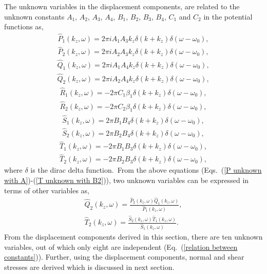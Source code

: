 \documentclass[10pt]{asme2ej}
\begin{document}
The unknown variables in the displacement components, are related to the unknown constants $A_1$, $A_2$, $A_3$, $A_4$, $B_1$, $B_2$, $B_3$, $B_4$, $C_1$ and $C_2$ in the potential functions as,
\begin{align}\label{P unknown with A}
    \hat{P}_1(k_z,\omega) = 2\pi i A_1 A_3 k_z\delta(k+k_z)\delta(\omega-\omega_0),\\\hat{P}_2(k_z,\omega) = 2\pi i A_2 A_3 k_z\delta(k+k_z)\delta(\omega-\omega_0),
\end{align}
\begin{align}\label{Q unknown with A}
    \hat{Q}_1(k_z,\omega) = 2\pi i A_1 A_4 k_z\delta(k+k_z)\delta(\omega-\omega_0),\\\hat{Q}_2(k_z,\omega) = 2\pi i A_2 A_4 k_z\delta(k+k_z)\delta(\omega-\omega_0),
\end{align}
\begin{align}\label{R unknown with C}
    \hat{R}_1(k_z,\omega) = -2\pi C_1\beta_1\delta(k+k_z)\delta(\omega-\omega_0),\\\hat{R}_2(k_z,\omega) = -2\pi C_2\beta_1\delta(k+k_z)\delta(\omega-\omega_0),
\end{align}
\begin{align}\label{S unknown with B}
    \hat{S}_1(k_z,\omega) = 2\pi B_1 B_4\delta(k+k_z)\delta(\omega-\omega_0),\\ \hat{S}_2(k_z,\omega) = 2\pi B_2 B_4\delta(k+k_z)\delta(\omega-\omega_0),
\end{align}
\begin{align}\label{T unknown with B}
    \hat{T}_1(k_z,\omega) = -2\pi B_1 B_3\delta(k+k_z)\delta(\omega-\omega_0),\\ \hat{T}_2(k_z,\omega) = -2\pi B_2 B_3\delta(k+k_z)\delta(\omega-\omega_0)\label{T unknown with B2},
\end{align}
where $\delta$ is the dirac delta function.~From the above equations (Eqs.~(\ref{P unknown with A})-(\ref{T unknown with B2})), two unknown variables can be expressed in terms of other variables as,
\begin{multline}\label{relation between constants}
    \hat{Q}_2(k_z,\omega) = \frac{\hat{P}_2(k_z,\omega) \hat{Q}_1(k_z,\omega)}{\hat{P}_1(k_z,\omega)},\\ \hat{T}_2(k_z,\omega) = \frac{\hat{S}_2(k_z,\omega) \hat{T}_1(k_z,\omega)}{\hat{S}_1(k_z,\omega)}.
\end{multline}
From the displacement components derived in this section, there are ten unknown variables, out of which only eight are independent (Eq.~(\ref{relation between constants})). Further, using the displacement components, normal and shear stresses are derived which is discussed in next section. 
\end{document}
